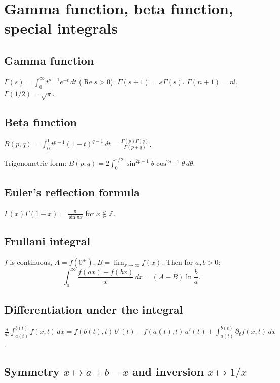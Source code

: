 \medskip

\section{Gamma function, beta function, special integrals}
\label{sec:special-functions}

\subsection{Gamma function}
\label{subsec:gamma}

$\Gamma(s)=\int_0^\infty t^{s-1}e^{-t}\,dt$ ($\operatorname{Re}s>0$). $\Gamma(s+1)=s\Gamma(s)$. $\Gamma(n+1)=n!$, $\Gamma(1/2)=\sqrt\pi$.

\subsection{Beta function}
\label{subsec:beta}

$B(p,q)=\int_0^1 t^{p-1}(1-t)^{q-1}\,dt=\frac{\Gamma(p)\Gamma(q)}{\Gamma(p+q)}$.

Trigonometric form: $B(p,q)=2\int_0^{\pi/2}\sin^{2p-1}\theta\cos^{2q-1}\theta\,d\theta$.

\subsection{Euler's reflection formula}
\label{subsec:reflection}

$\Gamma(x)\Gamma(1-x)=\frac{\pi}{\sin\pi x}$ for $x\notin\mathbb{Z}$.

\subsection{Frullani integral}
\label{subsec:frullani}

$f$ is continuous, $A=f(0^+)$, $B=\lim_{x\to\infty}f(x)$. Then for $a,b>0$:
$$\int_0^\infty\frac{f(ax)-f(bx)}{x}\,dx=(A-B)\ln\frac{b}{a}.$$

\subsection{Differentiation under the integral}
\label{subsec:diff-under-integral}

$\frac{d}{dt}\int_{a(t)}^{b(t)} f(x,t)\,dx = f(b(t),t)\,b'(t)-f(a(t),t)\,a'(t)+\int_{a(t)}^{b(t)}\partial_t f(x,t)\,dx$.

\medskip

\subsection{Symmetry $x\mapsto a+b-x$ and inversion $x\mapsto1/x$}
\label{subsec:symmetry-inversion}

